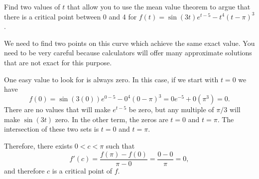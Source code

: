 \documentclass{ximera}
\author{Emma Smith Zbarsky}
\begin{document}
\begin{exercise}

Find two values of $t$ that allow you to use the mean value theorem to
argue that there is a critical point between 0 and 4 for
$f(t) = \sin(3t)e^{t-5}-t^4(t-\pi)^3$.


\begin{hint}
We need to find two points on this curve which achieve the same exact
value. You need to be very careful because calculators will offer many
approximate solutions that are not exact for this purpose.
\end{hint}


\begin{hint}
One easy value to look for is always zero. In this case, if we start
with $t=0$ we have
\[f(0) = \sin(3(0))e^{0-5}-0^4(0-\pi)^3 = 0e^{-5}+0(\pi^3) = 0.\] There
are no values that will make $e^{t-5}$ be zero, but any multiple of
$\pi/3$ will make $\sin(3t)$ zero. In the other term, the zeros are
$t=0$ and $t=\pi$. The intersection of these two sets is $t=0$ and
$t=\pi$.

Therefore, there exists $0 < c < \pi$ such that
\[f'(c) = \frac{f(\pi)-f(0)}{\pi-0} = \frac{0-0}{\pi} = 0,\] and
therefore $c$ is a critical point of $f$.
\end{hint}


\begin{multipleChoice}
\end{multipleChoice}

\end{exercise}
\end{document}
